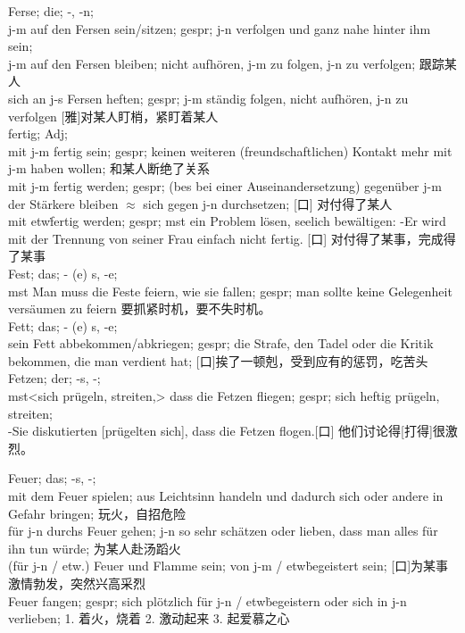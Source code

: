 \noindent
Ferse; die; -, -n; \\
j-m auf den Fersen sein/sitzen; gespr; j-n verfolgen und ganz nahe hinter ihm sein; \\
j-m auf den Fersen bleiben; nicht aufh\"oren, j-m zu folgen, j-n zu verfolgen; 跟踪某人\\
sich an j-s Fersen heften; gespr; j-m st\"andig folgen, nicht aufh\"oren, j-n zu verfolgen [雅]对某人盯梢，紧盯着某人\\ 

\noindent 
fertig; Adj;\\
mit j-m fertig sein; gespr; keinen weiteren (freundschaftlichen) Kontakt mehr mit j-m haben wollen; 和某人断绝了关系\\
mit j-m fertig werden; gespr; (bes bei einer Auseinandersetzung) gegen\"uber j-m der St\"arkere bleiben $\approx$ sich gegen j-n durchsetzen; [口] 对付得了某人\\
mit etw\. fertig werden; gespr; mst ein Problem l\"osen, seelich bew\"altigen: -Er wird mit der Trennung von seiner Frau einfach nicht fertig. [口] 对付得了某事，完成得了某事\\

\noindent
Fest; das; \-- (e) s, -e;\\
mst Man muss die Feste feiern, wie sie fallen; gespr; man sollte keine Gelegenheit vers\"aumen zu feiern 要抓紧时机，要不失时机。\\

\noindent
Fett; das; \-- (e) s, -e;\\
sein  Fett abbekommen/abkriegen; gespr; die Strafe, den Tadel oder die Kritik bekommen, die man verdient hat; [口]挨了一顿剋，受到应有的惩罚，吃苦头 \\

\noindent
Fetzen; der; -s, -;\\
mst<sich pr\"ugeln, streiten,> dass die Fetzen fliegen; gespr; sich heftig pr\"ugeln, streiten; \\
-Sie diskutierten [pr\"ugelten sich], dass die Fetzen flogen.[口] 他们讨论得[打得]很激烈。

\noindent
Feuer; das; -s, -;\\
mit dem Feuer spielen; aus Leichtsinn handeln und dadurch sich oder andere in Gefahr bringen; 玩火，自招危险\\
f\"ur j-n durchs Feuer gehen; j-n so sehr sch\"atzen oder lieben, dass man alles f\"ur  ihn tun w\"urde; 为某人赴汤蹈火\\
(f\"ur j-n / etw.) Feuer und Flamme sein; von j-m / etw\. begeistert sein; [口]为某事激情勃发，突然兴高采烈\\
Feuer fangen; gespr; sich pl\"otzlich f\"ur j-n / etw\. begeistern oder sich in j-n verlieben; 1. 着火，烧着 2. 激动起来 3. 起爱慕之心

